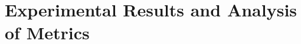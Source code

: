 \documentclass[12pt]{article}\usepackage[]{graphicx}\usepackage[]{color}
\newcommand{\hh}[1]{{\color{magenta} #1}}
\begin{document}
% 
% 
% 



\section{Experimental Results and Analysis of Metrics} \label{sec:results}


\end{document}
